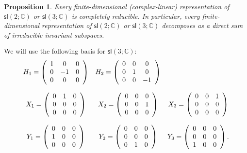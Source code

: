 \documentclass{amsbook}
\theoremstyle{plain}
\newtheorem{proposition}[theorem]{Proposition}
\numberwithin{equation}{chapter}
\numberwithin{theorem}{chapter}
\begin{document}
\begin{proposition}
\label{reduce.sl3}Every finite-dimensional (complex-linear) representation of
$\mathsf{sl}(2;\mathbb{C})$ or $\mathsf{sl}\left(  3;\mathbb{C}\right)  $ is
completely reducible. In particular, every finite-dimensional representation
of $\mathsf{sl}(2;\mathbb{C})$ or $\mathsf{sl}\left(  3;\mathbb{C}\right)  $
decomposes as a direct sum of irreducible invariant subspaces.
\end{proposition}

We will use the following basis for $\mathsf{sl}\left(  3;\mathbb{C}\right)
$:
\[%
\begin{array}
[c]{ccc}%
H_{1}=\left(
\begin{array}
[c]{ccc}%
1 & 0 & 0\\
0 & -1 & 0\\
0 & 0 & 0
\end{array}
\right)  & H_{2}=\left(
\begin{array}
[c]{ccc}%
0 & 0 & 0\\
0 & 1 & 0\\
0 & 0 & -1
\end{array}
\right)  & \\
&  & \\
X_{1}=\left(
\begin{array}
[c]{ccc}%
0 & 1 & 0\\
0 & 0 & 0\\
0 & 0 & 0
\end{array}
\right)  & X_{2}=\left(
\begin{array}
[c]{ccc}%
0 & 0 & 0\\
0 & 0 & 1\\
0 & 0 & 0
\end{array}
\right)  & X_{3}=\left(
\begin{array}
[c]{ccc}%
0 & 0 & 1\\
0 & 0 & 0\\
0 & 0 & 0
\end{array}
\right) \\
&  & \\
Y_{1}=\left(
\begin{array}
[c]{ccc}%
0 & 0 & 0\\
1 & 0 & 0\\
0 & 0 & 0
\end{array}
\right)  & Y_{2}=\left(
\begin{array}
[c]{ccc}%
0 & 0 & 0\\
0 & 0 & 0\\
0 & 1 & 0
\end{array}
\right)  & Y_{3}=\left(
\begin{array}
[c]{ccc}%
0 & 0 & 0\\
0 & 0 & 0\\
1 & 0 & 0
\end{array}
\right)  \text{.}%
\end{array}
\]
\end{document}
